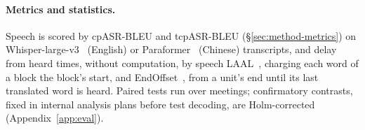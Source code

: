 \paragraph{Metrics and statistics.} Speech is scored by cpASR-BLEU and tcpASR-BLEU (\S\ref{sec:method-metrics}) on
Whisper-large-v3~\citep{radford2023robust} (English) or Paraformer~\citep{gao2022paraformer} (Chinese) transcripts, and
delay from heard times, without computation, by speech LAAL~\citep{papi2022over}, charging each word of a block the
block's start, and EndOffset~\citep{ma2020simuleval}, from a unit's end until its last translated word is heard. Paired
tests run over meetings; confirmatory contrasts, fixed in internal analysis plans before test decoding, are
Holm-corrected (Appendix~\ref{app:eval}).
